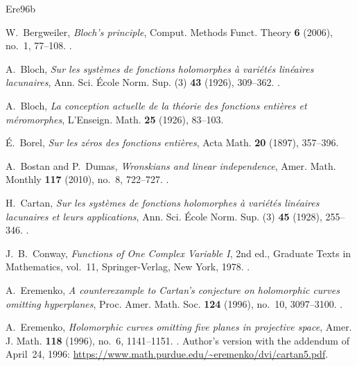 \documentclass[12pt,letterpaper,reqno]{amsart}
\theoremstyle{definition}
\numberwithin{equation}{section}
\begin{document}
	\begingroup
	\raggedright
	\begin{thebibliography}{Ere96b}
		
		W.~Bergweiler, \emph{Bloch's principle}, Comput. Methods Funct. Theory
		\textbf{6} (2006), no.~1, 77--108.
		.
		
		A.~Bloch, \emph{Sur les syst\`emes de fonctions holomorphes \`a
			vari\'et\'es lin\'eaires lacunaires}, Ann. Sci. \'Ecole Norm. Sup. (3)
		\textbf{43} (1926), 309--362. .
		
		A.~Bloch, \emph{La conception actuelle de la th\'eorie des fonctions enti\`eres
			et m\'eromorphes}, L'Enseign. Math. \textbf{25} (1926), 83--103.
		
		\'E.~Borel, \emph{Sur les z\'eros des fonctions enti\`eres},
		Acta Math. \textbf{20} (1897), 357--396.
		
		A.~Bostan and P.~Dumas, \emph{Wronskians and linear independence},
		Amer. Math. Monthly \textbf{117} (2010), no.~8, 722--727.
		.
		
		H.~Cartan, \emph{Sur les syst\`emes de fonctions holomorphes \`a
			vari\'et\'es lin\'eaires lacunaires et leurs applications}, Ann. Sci.
		\'Ecole Norm. Sup. (3) \textbf{45} (1928), 255--346.
		.

         J.~B.~Conway, \emph{Functions of One Complex Variable I},
         2nd ed., Graduate Texts in Mathematics, vol.~11,
         Springer-Verlag, New York, 1978.
        .
		
		
		A.~Eremenko, \emph{A counterexample to Cartan's conjecture on holomorphic
			curves omitting hyperplanes}, Proc. Amer. Math. Soc. \textbf{124} (1996),
		no.~10, 3097--3100. .
		
		A.~Eremenko, \emph{Holomorphic curves omitting five planes in projective
			space}, Amer. J. Math. \textbf{118} (1996), no.~6, 1141--1151.
		.
		Author's version with the addendum of April~24, 1996:
		\url{https://www.math.purdue.edu/~eremenko/dvi/cartan5.pdf}.
		

\end{thebibliography}
\end{document}
